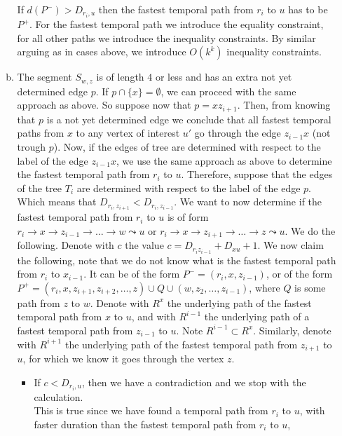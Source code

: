 \documentclass[11pt,a4paper]{article}
\theoremstyle{remark}
\theoremstyle{definition}
\begin{document}
\begin{enumerate}[(i)]
\begin{enumerate}[(a)]
        If $d(P^{-}) > D_{r_i,u} $ then the fastest temporal path from $r_i$ to $u$ has to be $P^{+}$.
        For the fastest temporal path we introduce the equality constraint, 
        for all other paths we introduce the inequality constraints.
        By similar arguing as in cases above, we introduce $O(k^k)$ inequality constraints.
        \item The segment $S_{w,z}$ is of length $4$ or less
        and has an extra not yet determined edge $p$. 
        If $p \cap \{x\} = \emptyset$, 
        we can proceed with the same approach as above.
        So suppose now that $p = x z_{i+1}$. 
        Then, from knowing that $p$ is a not yet determined edge we conclude that
        all fastest temporal paths from $x$ to any vertex of interest $u'$ go through the edge $z_{i-1}x$ (not trough $p$).
        Now, if the edges of tree are determined with respect to the label of the edge $z_{i-1}x$,
        we use the same approach as above to determine the fastest temporal path from $r_i$ to $u$.
        Therefore, suppose that the edges of the tree $T_i$ are determined with respect to the label of the edge $p$.
        Which means that $D_{r_i, z_{i+1}} < D_{r_i, z_{i-1}}$.
        We want to now determine if the fastest temporal path from $r_i$ to $u$ is of form 
        $r_i \rightarrow x \rightarrow z_{i-1} \rightarrow \dots \rightarrow w \leadsto u$ or
        $r_i \rightarrow x \rightarrow z_{i+1} \rightarrow \dots \rightarrow z \leadsto u$.
        We do the following.
        Denote with $c$ the value $c = D_{r_i z_{i-1}} + D_{x u} + 1$.
        We now claim the following, note that we do not know what is the fastest temporal path from $r_i$ to $x_{i-1}$. 
        It can be of the form $P^- = (r_i,x,z_{i-1})$,
        or of the form $P^+ = (r_i,x, z_{i+1}, z_{i+2}, \dots, z) \cup Q \cup (w, z_2, \dots, z_{i-1})$, where $Q$ is some path from $z$ to $w$.
        Denote with $R^x$ the underlying path of the fastest temporal path from $x$ to $u$,
        and with $R^{i-1}$ the underlying path of a fastest temporal path from $z_{i-1}$ to $u$.
        Note $R^{i-1} \subset R^x$.
        Similarly,
        denote with $R^{i+1}$ the underlying path of the fastest temporal path from $z_{i+1}$ to $u$, 
        for which we know it goes through the vertex $z$.
        \begin{itemize}
            \item  If $c < D_{r_i,u}$, then we have a contradiction and we stop with the calculation.\\
            This is true since we have found a temporal path from $r_i$ to $u$, with faster duration than the fastest temporal path from $r_i$ to $u$,

\end{itemize}
\end{enumerate}
\end{enumerate}
\end{document}
